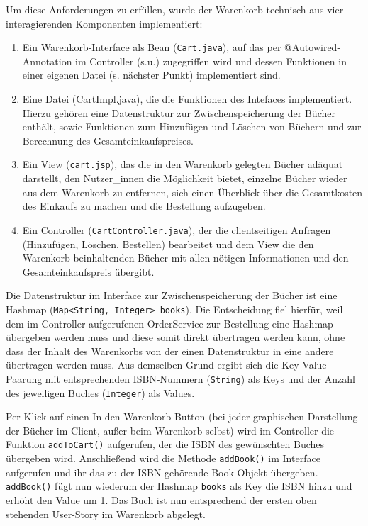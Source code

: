 	Um diese Anforderungen zu erfüllen, wurde der Warenkorb technisch aus vier interagierenden Komponenten implementiert:
	\begin{enumerate}
		\item Ein Warenkorb-Interface als Bean (\lstinline|Cart.java|), auf das per @Autowired-Annotation im Controller (s.u.) zugegriffen wird und dessen Funktionen in einer eigenen Datei (s. nächster Punkt) implementiert sind. 
		\item Eine Datei (CartImpl.java), die die Funktionen des Intefaces implementiert. Hierzu gehören eine Datenstruktur zur Zwi\-schen\-spei\-che\-rung der Bücher enthält, sowie Funktionen zum Hinzufügen und Lö\-schen von Büchern und zur Berechnung des Gesamteinkaufspreises.
		\item Ein View (\lstinline|cart.jsp|), das die in den Warenkorb gelegten Bücher adäquat darstellt, den Nutzer\_innen die Möglichkeit bietet, einzelne Bücher wieder aus dem Warenkorb zu entfernen, sich einen Überblick über die Gesamtkosten des Einkaufs zu machen und die Bestellung aufzugeben.
		\item Ein Controller (\lstinline|CartController.java|), der die clientseitigen Anfragen (Hinzufügen, Löschen, Bestellen) bearbeitet und dem View die den Warenkorb beinhaltenden Bücher mit allen nötigen Informationen und den Gesamteinkaufspreis übergibt.
	\end{enumerate}

	Die Datenstruktur im Interface zur Zwischenspeicherung der Bücher ist eine Hashmap (\lstinline|Map<String, Integer> books|). Die Entscheidung fiel hierfür, weil dem im Controller aufgerufenen OrderService zur Bestellung eine Hashmap übergeben werden muss und diese somit direkt übertragen werden kann, ohne dass der Inhalt des Warenkorbs von der einen Datenstruktur in eine andere übertragen werden muss. Aus demselben Grund ergibt sich die Key-Value-Paarung mit entsprechenden ISBN-Nummern (\lstinline|String|) als Keys und der Anzahl des jeweiligen Buches (\lstinline|Integer|) als Values. 
	 
	Per Klick auf einen In-den-Warenkorb-Button (bei jeder graphischen Darstellung der Bü\-cher im Client, außer beim Warenkorb selbst) wird im Controller die Funktion \lstinline|addToCart()| aufgerufen, der die ISBN des gewünschten Buches übergeben wird. Anschließend wird die Methode \lstinline|addBook()| im Interface aufgerufen und ihr das zu der ISBN gehörende Book-Objekt übergeben. \lstinline|addBook()| fügt nun wiederum der Hashmap \lstinline|books| als Key die ISBN hinzu und  erhöht den Value um 1. Das Buch ist nun entsprechend der ersten oben stehenden User-Story im Warenkorb abgelegt.
	
